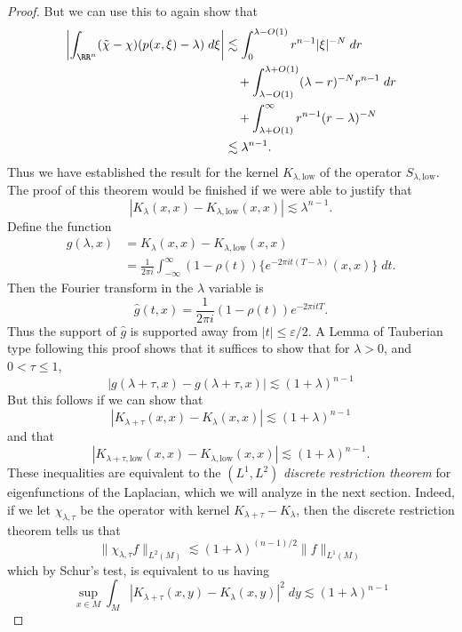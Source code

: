 \begin{proof}
    But we can use this to again show that
    \begin{align*}
        \left| \int_{\RR^n} (\tilde{\chi} - \chi)(p(x,\xi) - \lambda)\; d\xi \right| &\lesssim \int_0^{\lambda - O(1)} r^{n-1} |\xi|^{-N}\; dr\\
        &\quad + \int_{\lambda - O(1)}^{\lambda + O(1)} (\lambda - r)^{-N} r^{n-1}\; dr\\
        &\quad + \int_{\lambda + O(1)}^\infty r^{n-1} (r - \lambda)^{-N}\\
        &\lesssim \lambda^{n-1}.
    \end{align*}
    Thus we have established the result for the kernel $K_{\lambda,\text{low}}$ of the operator $S_{\lambda,\text{low}}$. The proof of this theorem would be finished if we were able to justify that
    \[ |K_\lambda(x,x) - K_{\lambda,\text{low}}(x,x)| \lesssim \lambda^{n-1}. \]
    Define the function
    \begin{align*}
        g(\lambda,x) &= K_\lambda(x,x) - K_{\lambda,\text{low}}(x,x)\\
        &= \frac{1}{2\pi i} \int_{-\infty}^\infty (1 - \rho(t)) \{ e^{-2 \pi i t (T - \lambda)}(x,x) \}\; dt.
    \end{align*}
    Then the Fourier transform in the $\lambda$ variable is
    \[ \widehat{g}(t,x) = \frac{1}{2 \pi i} (1 - \rho(t)) e^{-2 \pi i t T}. \]
    Thus the support of $\widehat{g}$ is supported away from $|t| \leq \varepsilon / 2$. A Lemma of Tauberian type following this proof shows that it suffices to show that for $\lambda > 0$, and $0 < \tau \leq 1$,
    \[ |g(\lambda + \tau,x) - g(\lambda + \tau,x)| \lesssim (1 + \lambda)^{n-1} \]
    But this follows if we can show that
    \[ |K_{\lambda + \tau}(x,x) - K_\lambda(x,x)| \lesssim (1 + \lambda)^{n-1} \]
    and that
    \[ |K_{\lambda + \tau, \text{low}}(x,x) - K_{\lambda, \text{low}}(x,x)| \lesssim (1 + \lambda)^{n-1}. \]
    These inequalities are equivalent to the $(L^1,L^2)$ \emph{discrete restriction theorem} for eigenfunctions of the Laplacian, which we will analyze in the next section. Indeed, if we let $\chi_{\lambda,\tau}$ be the operator with kernel $K_{\lambda + \tau} - K_\lambda$, then the discrete restriction theorem tells us that
    \[ \| \chi_{\lambda,\tau} f \|_{L^2(M)} \lesssim (1 + \lambda)^{(n-1)/2} \| f \|_{L^1(M)} \]
    which by Schur's test, is equivalent to us having
    \[ \sup_{x \in M} \int_M |K_{\lambda + \tau}(x,y) - K_\lambda(x,y)|^2\; dy \lesssim (1 + \lambda)^{n-1} \]

\end{proof}
